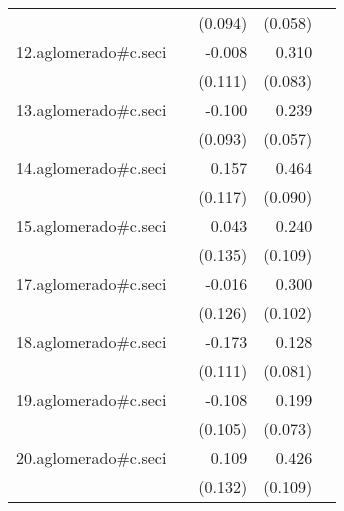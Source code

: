 {\begin{longtable}{l*{4}{D{.}{.}{-1}}}
            &                     &     (0.094)         &     (0.058)         &                     \\
\addlinespace
12.aglomerado#c.seci&                     &      -0.008         &       0.310\sym{***}&                     \\
            &                     &     (0.111)         &     (0.083)         &                     \\
\addlinespace
13.aglomerado#c.seci&                     &      -0.100         &       0.239\sym{***}&                     \\
            &                     &     (0.093)         &     (0.057)         &                     \\
\addlinespace
14.aglomerado#c.seci&                     &       0.157         &       0.464\sym{***}&                     \\
            &                     &     (0.117)         &     (0.090)         &                     \\
\addlinespace
15.aglomerado#c.seci&                     &       0.043         &       0.240\sym{*}  &                     \\
            &                     &     (0.135)         &     (0.109)         &                     \\
\addlinespace
17.aglomerado#c.seci&                     &      -0.016         &       0.300\sym{**} &                     \\
            &                     &     (0.126)         &     (0.102)         &                     \\
\addlinespace
18.aglomerado#c.seci&                     &      -0.173         &       0.128         &                     \\
            &                     &     (0.111)         &     (0.081)         &                     \\
\addlinespace
19.aglomerado#c.seci&                     &      -0.108         &       0.199\sym{**} &                     \\
            &                     &     (0.105)         &     (0.073)         &                     \\
\addlinespace
20.aglomerado#c.seci&                     &       0.109         &       0.426\sym{***}&                     \\
            &                     &     (0.132)         &     (0.109)         &                     \\

\end{longtable}}
